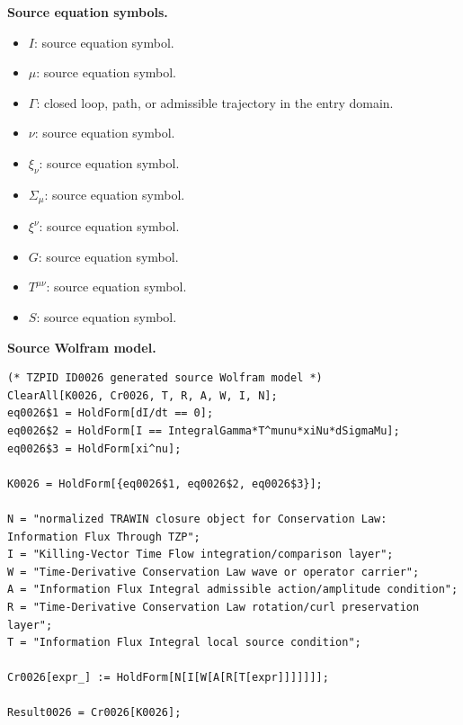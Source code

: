\begin{minipage}[t]{0.49\linewidth}
\begingroup
\small
\raggedright
\textbf{Source equation symbols.}\par
\begin{itemize}[leftmargin=1.35em,itemsep=1pt,topsep=1pt,parsep=0pt]
    \item $I$: source equation symbol.
    \item $\mu$: source equation symbol.
    \item $\Gamma$: closed loop, path, or admissible trajectory in the entry domain.
    \item $\nu$: source equation symbol.
    \item $\xi_{\nu}$: source equation symbol.
    \item $\Sigma_{\mu}$: source equation symbol.
    \item $\xi^{\nu}$: source equation symbol.
    \item $G$: source equation symbol.
    \item $T^{\mu\nu}$: source equation symbol.
    \item $S$: source equation symbol.
\end{itemize}
\endgroup
\end{minipage}\hfill
\begin{minipage}[t]{0.47\linewidth}
\begingroup
\scriptsize
\raggedright
\textbf{Source Wolfram model.}\par
\begin{Verbatim}[fontsize=\tiny,breaklines=true,breakanywhere=true]
(* TZPID ID0026 generated source Wolfram model *)
ClearAll[K0026, Cr0026, T, R, A, W, I, N];
eq0026$1 = HoldForm[dI/dt == 0];
eq0026$2 = HoldForm[I == IntegralGamma*T^munu*xiNu*dSigmaMu];
eq0026$3 = HoldForm[xi^nu];

K0026 = HoldForm[{eq0026$1, eq0026$2, eq0026$3}];

N = "normalized TRAWIN closure object for Conservation Law: Information Flux Through TZP";
I = "Killing-Vector Time Flow integration/comparison layer";
W = "Time-Derivative Conservation Law wave or operator carrier";
A = "Information Flux Integral admissible action/amplitude condition";
R = "Time-Derivative Conservation Law rotation/curl preservation layer";
T = "Information Flux Integral local source condition";

Cr0026[expr_] := HoldForm[N[I[W[A[R[T[expr]]]]]]];

Result0026 = Cr0026[K0026];
\end{Verbatim}
\endgroup
\end{minipage}

